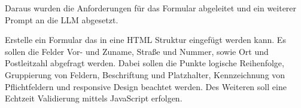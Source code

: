 Daraus wurden die Anforderungen für das Formular abgeleitet und ein weiterer Prompt an die LLM abgesetzt.\vspace{0.2cm}

\begin{tcolorbox}[
	enhanced,
	breakable,
	colback=BhtColorYellow!5!white,
	colframe=BhtColorYellow!75!black,
	title= Nutzer Prompt
	]
	Erstelle ein Formular das in eine HTML Struktur eingefügt werden kann. Es sollen die Felder Vor- und Zuname, Straße und Nummer, sowie Ort und Postleitzahl abgefragt werden. Dabei sollen die Punkte logische Reihenfolge, Gruppierung von Feldern, Beschriftung und Platzhalter, Kennzeichnung von Pflichtfeldern und responsive Design beachtet werden. Des Weiteren soll eine Echtzeit Validierung mittels JavaScript erfolgen.
\end{tcolorbox}

